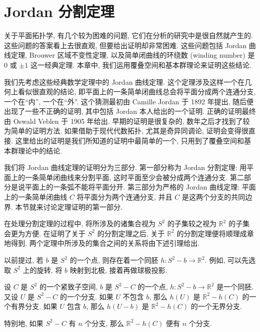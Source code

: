 \section{Jordan 分割定理}\label{ch10:section-jordan-separation}

关于平面拓扑学, 有几个较为困难的问题, 它们在分析的研究中是很自然就产生的. 这些问题的答案看上去很直观, 但要给出证明却非常困难. 这些问题包括 Jordan 曲线定理, Brouwer 区域不变性定理, 以及简单闭曲线的环绕数 (winding number) 是 $0$ 或 $\pm 1$ 这一经典定理. 本章中, 我们运用覆叠空间和基本群理论来证明这些结论.

我们先考虑这些经典数学定理中的 Jordan 曲线定理. 这个定理涉及这样一个在几何上看似很直观的结论, 即平面上的一条简单闭曲线总会将平面分成两个连通分支, 一个在``内'', 一个在``外''. 这个猜测最初由 Camille Jordan 于 1892 年提出, 随后便出现了一些不正确的证明, 其中包括 Jordan 本人给出的一个证明. 正确的证明最终由 Oswald Veblen 于 1905 年给出. 早期的证明是很复杂的, 数年之后才找到了较为简单的证明方法. 如果借助于现代代数拓扑, 尤其是奇异同调论, 证明会变得很直接. 这里给出的证明是我们所知道的证明中最简单的一个, 只用到了覆叠空间和基本群理论中的结论.

我们将 Jordan 曲线定理的证明分为三部分. 第一部分称为 Jordan 分割定理: 用平面上的一条简单闭曲线来分割平面, 这时平面至少会被分成两个连通分支. 第二部分是说平面上的一条弧不能将平面分开. 第三部分为严格的 Jordan 曲线定理: 平面上的一条简单闭曲线 $C$ 将平面分为两个连通分支, 并且 $C$ 是这两个分支的共同边界. 本节就来讨论定理证明的第一部分.

在处理分割定理的过程中, 将所涉及的诸集合视为 $S^{2}$ 的子集较之视为 $\mathbb{R}^{2}$ 的子集会更为方便. 在证明了关于 $S^{2}$ 的分割定理之后, 关于 $\mathbb{R}^{2}$ 的分割定理便将顺理成章地得到. 两个定理中所涉及的集合之间的关系将由下述引理给出.

以前提过, 若 $b$ 是 $S^{2}$ 的一个点, 则存在着一个同胚 $h\colon S^{2}-b\to\mathbb{R}^{2}$. 例如, 可以先选取 $S^{2}$ 上的旋转, 将 $b$ 映射到北极, 接着再做球极投影.

\begin{lemma}\label{ch10:lemma-component}
设 $C$ 是 $S^{2}$ 的一个紧致子空间, $b$ 是 $S^{2}-C$ 的一个点, $h\colon S^{2}-b\to\mathbb{R}^{2}$ 是一个同胚. 又设 $U$ 是 $S^{2}-C$ 的一个分支. 如果 $U$ 不包含 $b$, 那么 $h(U)$ 是 $\mathbb{R}^{2}-h(C)$ 的一个有界分支. 如果 $U$ 包含 $b$, 那么 $h(U-b)$ 是 $\mathbb{R}^{2}-h(C)$ 的一个无界分支.

特别地, 如果 $S^{2}-C$ 有 $n$ 个分支, 那么 $\mathbb{R}^{2}-h(C)$ 便有 $n$ 个分支.
\end{lemma}

